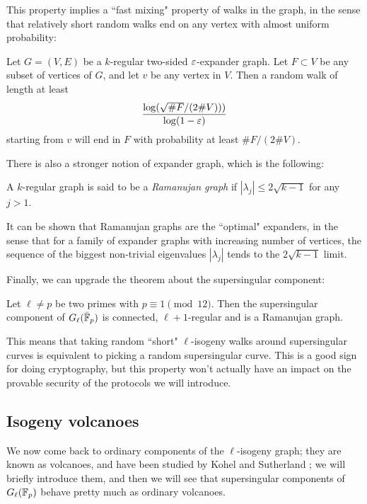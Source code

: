 This property implies a ``fast mixing" property of walks in the graph, in the sense that relatively short random walks end on any vertex with almost uniform probability:
\begin{proposition}
    Let $G=(V,E)$ be a $k$-regular two-sided $\varepsilon$-expander graph. Let $F\subset V$ be any subset of vertices of $G$, and let $v$ be any vertex in $V$. Then a random walk of length at least $$\frac{\log(\sqrt{\# F}/(2\# V)))}{\log(1-\varepsilon)}$$ starting from $v$ will end in $F$ with probability at least $\# F / (2\# V)$.
\end{proposition}

There is also a stronger notion of expander graph, which is the following:
\begin{definition}
    A $k$-regular graph is said to be a \emph{Ramanujan graph} if $|\lambda_j|\le2\sqrt{k-1}$ for any $j>1$.
\end{definition}
It can be shown that Ramanujan graphs are the ``optimal" expanders, in the sense that for a family of expander graphs with increasing number of vertices, the sequence of the biggest non-trivial eigenvalues $|\lambda_j|$ tends to the $2\sqrt{k-1}$ limit.

Finally, we can upgrade the theorem about the supersingular component:
\begin{theorem}
    Let $\ell\neq p$ be two primes with $p\equiv1\pmod{12}$. Then the supersingular component of $G_\ell(\bar{\mathbb{F}}_p)$ is connected, $\ell+1$-regular and is a Ramanujan graph.
\end{theorem}
This means that taking random ``short" $\ell$-isogeny walks around supersingular curves is equivalent to picking a random supersingular curve. This is a good sign for doing cryptography, but this property won't actually have an impact on the provable security of the protocols we will introduce.

\subsection{Isogeny volcanoes}
We now come back to ordinary components of the $\ell$-isogeny graph; they are known as volcanoes, and have been studied by Kohel \cite{Kohel_thesis} and Sutherland \cite{Sutherland_volcanoes}; we will briefly introduce them, and then we will see that supersingular components of $G_\ell(\mathbb{F}_p)$ behave pretty much as ordinary volcanoes.

